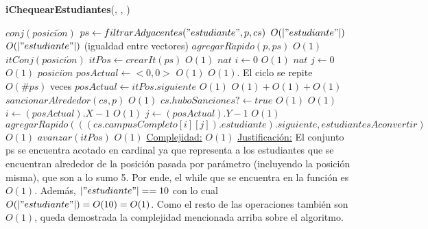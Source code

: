 \begin{Algoritmos}
\begin{algorithm}[H]{\textbf{iChequearEstudiantes}(, , )}
  \begin{algorithmic}
        \State $conj(posici\acute{o}n)$ $ps \gets filtrarAdyacentes("estudiante",p,cs)$	\Comment $O(|"estudiante"|)$
        	\Comment $O(|"estudiante"|)$ (igualdad entre vectores)
	        \State $agregarR\acute{a}pido(p,ps)$ \Comment $O(1)$
            \EndIf
        \State $itConj(posici\acute{o}n)$ $itPos \gets crearIt(ps)$ \Comment $O(1)$
        \State $nat$ $i \gets 0$	\Comment $O(1)$
        \State $nat$ $j \gets 0$	\Comment $O(1)$
        \State $posici\acute{o}n$ $posActual \gets <0,0>$	\Comment $O(1)$
        	\Comment $O(1)$. El ciclo se repite $O(\#ps)$ veces
            \State $posActual \gets itPos.siguiente$ \Comment $O(1)$
            	\Comment $O(1) + O(1) + O(1) $
				\State $sancionarAlrededor(cs,p)$	\Comment $O(1)$
                \State $cs.huboSanciones? \gets true$	\Comment $O(1)$
            \EndIf
            	\Comment $O(1)$
				\State $i \gets (posActual).X-1$	\Comment $O(1)$
                \State $j \gets (posActual).Y-1$	\Comment $O(1)$
            	\State $agregarRapido(((cs.campusCompleto[i][j]).estudiante).siguiente,estudiantesAconvertir)$	\Comment $O(1)$
            \EndIf
            \State $avanzar(itPos)$	\Comment $O(1)$
            \medskip
	\Statex \underline{Complejidad:} $O(1)$
    \Statex \underline{Justificaci\'on:} El conjunto ps se encuentra acotado en cardinal ya que representa a los estudiantes que se encuentran alrededor de la posici\'on pasada por par\'ametro (incluyendo la posici\'on misma), que son a lo sumo 5. Por ende, el while que se encuentra en la funci\'on es $O(1)$. Adem\'as, $|"estudiante"| == 10$ con lo cual $O(|"estudiante"|) = O(10) = O(1)$. Como el resto de las operaciones tambi\'en son $O(1)$, queda demostrada la complejidad mencionada arriba sobre el algoritmo.
		\EndWhile
  \end{algorithmic}
\end{algorithm}


\end{Algoritmos}
